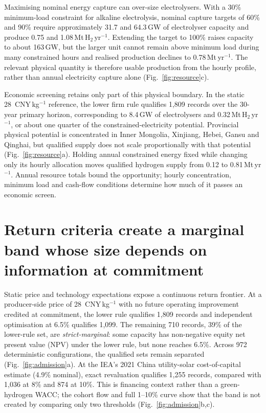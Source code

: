 \documentclass[11pt,a4paper]{article}
\newcommand{\cnykg}{CNY\,kg$^{-1}$}
\begin{document}
Maximising nominal energy capture can over-size electrolysers. With a 30\% minimum-load constraint for alkaline electrolysis, nominal capture targets of 60\% and 90\% require approximately 31.7 and 64.3\,GW of electrolyser capacity and produce 0.75 and 1.08\,Mt\,H$_2$\,yr$^{-1}$. Extending the target to 100\% raises capacity to about 163\,GW, but the larger unit cannot remain above minimum load during many constrained hours and realised production declines to 0.78\,Mt\,yr$^{-1}$. The relevant physical quantity is therefore usable production from the hourly profile, rather than annual electricity capture alone (Fig.~\ref{fig:resource}c).

Economic screening retains only part of this physical boundary. In the static 28~\cnykg{} reference, the lower firm rule qualifies 1,809 records over the 30-year primary horizon, corresponding to 8.4\,GW of electrolysers and 0.32\,Mt\,H$_2$\,yr$^{-1}$, or about one quarter of the constrained-electricity potential. Provincial physical potential is concentrated in Inner Mongolia, Xinjiang, Hebei, Gansu and Qinghai, but qualified supply does not scale proportionally with that potential (Fig.~\ref{fig:resource}a). Holding annual constrained energy fixed while changing only its hourly allocation moves qualified hydrogen supply from 0.12 to 0.81\,Mt\,yr$^{-1}$. Annual resource totals bound the opportunity; hourly concentration, minimum load and cash-flow conditions determine how much of it passes an economic screen.

\section*{Return criteria create a marginal band whose size depends on information at commitment}

Static price and technology expectations expose a continuous return frontier. At a producer-side price of 28~\cnykg{} with no future operating improvement credited at commitment, the lower rule qualifies 1,809 records and independent optimisation at 6.5\% qualifies 1,099. The remaining 710 records, 39\% of the lower-rule set, are \emph{strict-marginal}: some capacity has non-negative equity net present value (NPV) under the lower rule, but none reaches 6.5\%. Across 972 deterministic configurations, the qualified sets remain separated (Fig.~\ref{fig:admission}a). At the IEA's 2021 China utility-solar cost-of-capital estimate (4.9\% nominal), exact revaluation qualifies 1,255 records, compared with 1,036 at 8\% and 874 at 10\%\cite{ieacapital}. This is financing context rather than a green-hydrogen WACC; the cohort flow and full 1--10\% curve show that the band is not created by comparing only two thresholds (Fig.~\ref{fig:admission}b,c).
\end{document}
